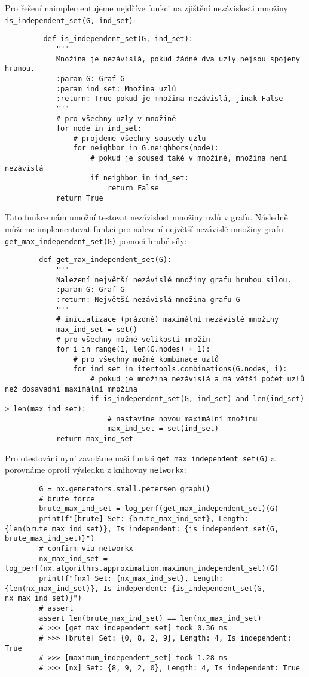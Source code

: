 \documentclass[10pt, a4paper]{ReportSheet}
\begin{document}
    Pro řešení naimplementujeme nejdříve funkci na zjištění nezávislosti množiny \texttt{is\_independent\_set(G,~ind\_set)}:
    \begin{verbatim}
         def is_independent_set(G, ind_set):
            """
            Množina je nezávislá, pokud žádné dva uzly nejsou spojeny hranou.
            :param G: Graf G
            :param ind_set: Množina uzlů
            :return: True pokud je množina nezávislá, jinak False
            """
            # pro všechny uzly v množině
            for node in ind_set:
                # projdeme všechny sousedy uzlu
                for neighbor in G.neighbors(node):
                    # pokud je soused také v množině, množina není nezávislá
                    if neighbor in ind_set:
                        return False
            return True
    \end{verbatim}

    Tato funkce nám umožní testovat nezávislost množiny uzlů v grafu. Následně můžeme implementovat funkci pro
    nalezení největší nezávislé množiny grafu \texttt{get\_max\_independent\_set(G)} pomocí hrubé síly:
    \begin{verbatim}
        def get_max_independent_set(G):
            """
            Nalezení největší nezávislé množiny grafu hrubou silou.
            :param G: Graf G
            :return: Největší nezávislá množina grafu G
            """
            # inicializace (prázdné) maximální nezávislé množiny
            max_ind_set = set()
            # pro všechny možné velikosti množin
            for i in range(1, len(G.nodes) + 1):
                # pro všechny možné kombinace uzlů
                for ind_set in itertools.combinations(G.nodes, i):
                    # pokud je množina nezávislá a má větší počet uzlů než dosavadní maximální množina
                    if is_independent_set(G, ind_set) and len(ind_set) > len(max_ind_set):
                        # nastavíme novou maximální množinu
                        max_ind_set = set(ind_set)
            return max_ind_set
    \end{verbatim}

    Pro otestování nyní zavoláme naši funkci \texttt{get\_max\_independent\_set(G)} a porovnáme oproti výsledku z
    knihovny \texttt{networkx}:
    \begin{verbatim}
        G = nx.generators.small.petersen_graph()
        # brute force
        brute_max_ind_set = log_perf(get_max_independent_set)(G)
        print(f"[brute] Set: {brute_max_ind_set}, Length: {len(brute_max_ind_set)}, Is independent: {is_independent_set(G, brute_max_ind_set)}")
        # confirm via networkx
        nx_max_ind_set = log_perf(nx.algorithms.approximation.maximum_independent_set)(G)
        print(f"[nx] Set: {nx_max_ind_set}, Length: {len(nx_max_ind_set)}, Is independent: {is_independent_set(G, nx_max_ind_set)}")
        # assert
        assert len(brute_max_ind_set) == len(nx_max_ind_set)
        # >>> [get_max_independent_set] took 0.36 ms
        # >>> [brute] Set: {0, 8, 2, 9}, Length: 4, Is independent: True
        # >>> [maximum_independent_set] took 1.28 ms
        # >>> [nx] Set: {8, 9, 2, 0}, Length: 4, Is independent: True
    \end{verbatim}
\end{document}

